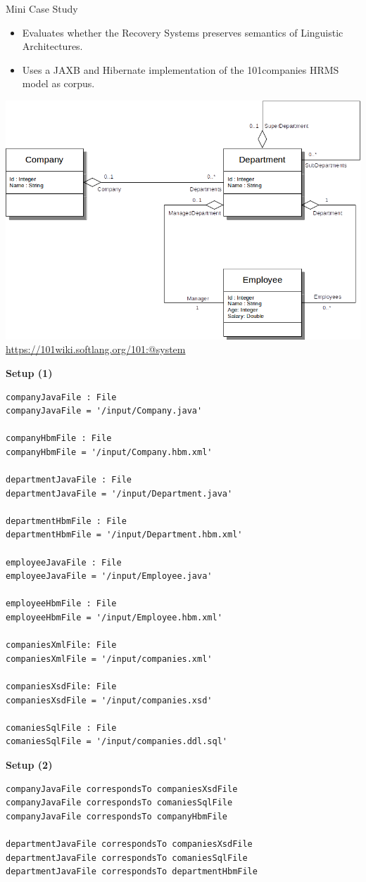 \documentclass{beamer}
\begin{document}
\begin{frame}{Mini Case Study}
\begin{itemize}
\item
Evaluates whether the Recovery Systems preserves semantics of Linguistic Architectures.
\item
Uses a JAXB and Hibernate implementation of the 101companies HRMS model as corpus.
\end{itemize}
\begin{center}
\includegraphics[width=.5\textwidth]{101HRMSModel.png}
\\
\url{https://101wiki.softlang.org/101:@system}
\end{center}
\pagebreak
\textbf{Setup (1)}
\begin{lstlisting}
companyJavaFile : File
companyJavaFile = '/input/Company.java'

companyHbmFile : File
companyHbmFile = '/input/Company.hbm.xml'

departmentJavaFile : File
departmentJavaFile = '/input/Department.java'

departmentHbmFile : File
departmentHbmFile = '/input/Department.hbm.xml'

employeeJavaFile : File
employeeJavaFile = '/input/Employee.java'

employeeHbmFile : File
employeeHbmFile = '/input/Employee.hbm.xml'

companiesXmlFile: File
companiesXmlFile = '/input/companies.xml'

companiesXsdFile: File
companiesXsdFile = '/input/companies.xsd'

comaniesSqlFile : File
comaniesSqlFile = '/input/companies.ddl.sql'
\end{lstlisting}
\pagebreak
\textbf{Setup (2)}
\begin{lstlisting}
companyJavaFile correspondsTo companiesXsdFile
companyJavaFile correspondsTo comaniesSqlFile
companyJavaFile correspondsTo companyHbmFile

departmentJavaFile correspondsTo companiesXsdFile
departmentJavaFile correspondsTo comaniesSqlFile
departmentJavaFile correspondsTo departmentHbmFile


\end{lstlisting}
\end{frame}
\end{document}
